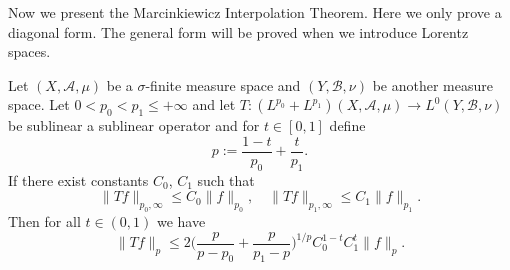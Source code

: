 Now we present the Marcinkiewicz Interpolation Theorem. Here we only prove a diagonal form. The general form will be proved when we introduce Lorentz spaces.
\begin{theorem}\label{Marcinkiewicz interpolation diagonal}
Let $(X,\mathcal{A},\mu)$ be a $\sigma$-finite measure space and $(Y,\mathcal{B},\nu)$ be another measure space. Let $0<p_0<p_1\leq+\infty$ and let $T:(L^{p_0}+L^{p_1})(X,\mathcal{A},\mu)\to L^0(Y,\mathcal{B},\nu)$ be sublinear a sublinear operator and for $t\in[0,1]$ define
\[p:=\frac{1-t}{p_0}+\frac{t}{p_1}.\]
If there exist constants $C_0$, $C_1$ such that
\[\|Tf\|_{p_0,\infty}\leq C_0\|f\|_{p_0},\quad \|Tf\|_{p_1,\infty}\leq C_1\|f\|_{p_1}.\]
Then for all $t\in(0,1)$ we have
\[\|Tf\|_{p}\leq 2\Big(\frac{p}{p-p_0}+\frac{p}{p_1-p}\Big)^{1/p}C_0^{1-t}C_1^t\|f\|_p.\]
\end{theorem}
